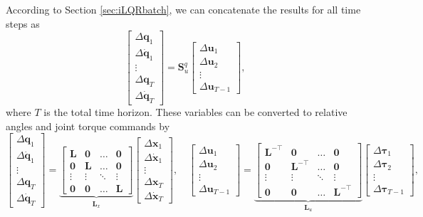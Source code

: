 \documentclass[10pt,a4paper]{article} %
\newcommand{\trsp}{{\scriptscriptstyle\top}}
\begin{document}
According to Section \ref{sec:iLQRbatch}, we can concatenate the results for all time steps as
\begin{equation}\label{eq:transfer_matrix_abs_ang_gen_force}
    \begin{bmatrix}
    \Delta \bm{q}_1 \\ \Delta \bm{\dot{q}}_1 \\ \vdots \\ \Delta \bm{q}_T \\ \Delta \bm{\dot{q}}_T
	\end{bmatrix}     = \bm{S}_u^q \begin{bmatrix}
	\Delta \bm{u}_1 \\ \Delta \bm{u}_2 \\ \vdots \\ \Delta \bm{u}_{T-1}
	\end{bmatrix},
\end{equation}
where $T$ is the total time horizon. These variables can be converted to relative angles and joint torque commands by
\begin{equation*}
\begin{bmatrix}
    \Delta \bm{q}_1 \\ \Delta \bm{\dot{q}}_1 \\ \vdots \\ \Delta \bm{q}_T \\ \Delta \bm{\dot{q}}_T
	\end{bmatrix} = \underset{\bm{L}_x}{\underbrace{\begin{bmatrix}
	\bm{L} & \bm{0} & \hdots & \bm{0} \\ \bm{0} & \bm{L} & \hdots & \bm{0} \\ \vdots & \vdots & \ddots & \vdots \\ \bm{0} & \bm{0} &\hdots & \bm{L}
	\end{bmatrix}}} \begin{bmatrix}
		\Delta \bm{x}_1 \\ \Delta \bm{\dot{x}}_1 \\ \vdots \\ \Delta \bm{x}_T \\ \Delta \bm{\dot{x}}_T
	\end{bmatrix},\quad
	\begin{bmatrix}
	\Delta \bm{u}_1 \\ \Delta \bm{u}_2 \\ \vdots \\ \Delta \bm{u}_{T-1}
	\end{bmatrix} = \underset{\bm{L}_u}{\underbrace{\begin{bmatrix}
	\bm{L}^{-\trsp} & \bm{0} & \hdots & \bm{0} \\ \bm{0} & \bm{L}^{-\trsp} & \hdots & \bm{0} \\ \vdots & \vdots & \ddots & \vdots \\ \bm{0} & \bm{0} &\hdots & \bm{L}^{-\trsp}
	\end{bmatrix}}}  \begin{bmatrix}
	\Delta \bm{\tau}_1 \\ \Delta \bm{\tau}_2 \\ \vdots \\ \Delta \bm{\tau}_{T-1}
	\end{bmatrix}, 
\end{equation*}
\end{document}
